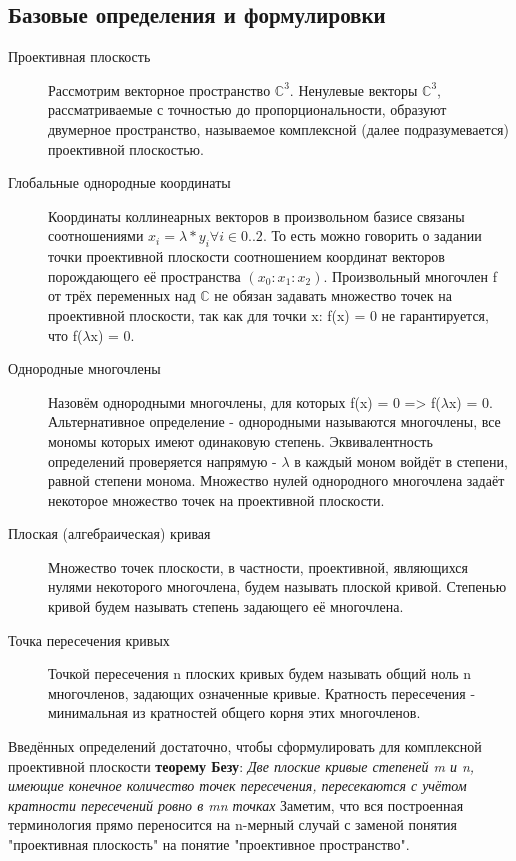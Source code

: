 \documentclass[a4paper, 12pt]{article}
\begin{document}
\subsection{Базовые определения и формулировки}
\begin{description}
\item[Проективная плоскость]
Рассмотрим векторное пространство $\mathbb{C}^3$. Ненулевые векторы $\mathbb{C}^3$, рассматриваемые с точностью до пропорциональности, образуют двумерное пространство, называемое комплексной (далее подразумевается) проективной плоскостью.
\item[Глобальные однородные координаты]
Координаты коллинеарных векторов в произвольном базисе связаны соотношениями $x_i=\lambda*y_i  \forall i \in {0..2}$. То есть можно говорить о задании точки проективной плоскости соотношением координат векторов порождающего её пространства $(x_0:x_1:x_2)$.
Произвольный многочлен f от трёх переменных над $\mathbb{C}$ не обязан задавать множество точек на проективной плоскости, так как для точки x: f(x) = 0 не гарантируется, что f($\lambda$x) = 0.
\item[Однородные многочлены] Назовём однородными многочлены, для которых f(x) = 0 => f($\lambda$x) = 0. Альтернативное определение - однородными называются многочлены, все мономы которых имеют одинаковую степень. Эквивалентность определений проверяется напрямую - $\lambda$ в каждый моном войдёт в степени, равной степени монома. Множество нулей однородного многочлена задаёт некоторое множество точек на проективной плоскости.
\item[Плоская (алгебраическая) кривая]
Множество точек плоскости, в частности, проективной, являющихся нулями некоторого многочлена, будем называть плоской кривой. Степенью кривой будем называть степень задающего её многочлена.
\item[Точка пересечения кривых]
Точкой пересечения n плоских кривых будем называть общий ноль n многочленов, задающих означенные кривые. Кратность пересечения - минимальная из кратностей общего корня этих многочленов.
\end{description}
Введённых определений достаточно, чтобы сформулировать для комплексной проективной плоскости \textbf{теорему Безу}:
\textit{Две плоские кривые степеней m и n, имеющие конечное количество точек пересечения, пересекаются с учётом кратности пересечений ровно в mn точках}
Заметим, что вся построенная терминология прямо переносится на n-мерный случай с заменой понятия "проективная плоскость" на понятие "проективное пространство".
\end{document}
